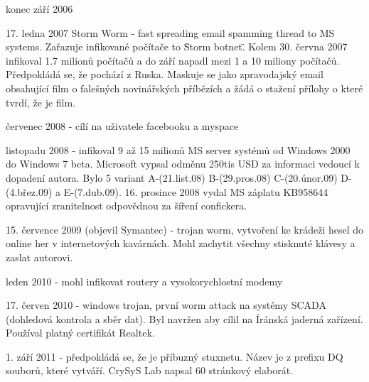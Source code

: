 \documentclass[a4paper,12pt]{article}
\begin{document}
konec září 2006

17. ledna 2007 Storm Worm - fast spreading email spamming thread to MS systems. Zařazuje infikované počítače to \"Storm botnet\". Kolem 30. června 2007 infikoval 1.7 milionů počítačů a do září napadl mezi 1 a 10 miliony počítačů. Předpokládá se, že pochází z Ruska. Maskuje se jako zpravodajský email obsahující film o falešných novinářských příbězích a žádá o stažení přílohy o které tvrdí, že je film.

červenec 2008 - cílí na uživatele facebooku a myspace

listopadu 2008 - infikoval 9 až 15 milionů MS server systémů od Windows 2000 do Windows 7 beta. Microsoft vypsal odměnu 250tis USD za informaci vedoucí k dopadení autora. Bylo 5 variant A-(21.list.08) B-(29.pros.08) C-(20.únor.09) D-(4.břez.09) a E-(7.dub.09). 16. prosince 2008 vydal MS záplatu KB958644 opravující zranitelnost odpovědnou za šíření confickera.

15. července 2009 (objevil Symantec) - trojan worm, vytvoření ke krádeži hesel do online her v internetových kavárnách. Mohl zachytit všechny stisknuté klávesy a zaslat autorovi.

leden 2010 - mohl infikovat routery a vysokorychlostní modemy

17. červen 2010 - windows trojan, první worm attack na systémy SCADA (dohledová kontrola a sběr dat). Byl navržen aby cílil na Íránská jaderná zařízení. Používal platný certifikát Realtek.

1. září 2011 - předpokládá se, že je příbuzný stuxnetu. Název je z prefixu DQ souborů, které vytváří. CrySyS Lab napsal 60 stránkový elaborát.
\end{document}
